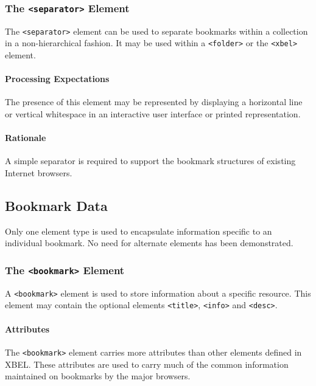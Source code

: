 \documentclass{howto}
\newcommand{\element}[1]{\texttt{<#1>}}
\begin{document}
    \subsubsection{The \element{separator} Element
                   \label{element-separator}}

      The \element{separator} element can be used to separate
      bookmarks within a collection in a non-hierarchical fashion.  It 
      may be used within a \element{folder} or the \element{xbel}
      element.

      \paragraph*{Processing Expectations}
        The presence of this element may be represented by displaying
        a horizontal line or vertical whitespace in an interactive
        user interface or printed representation.

      \paragraph*{Rationale}
        A simple separator is required to support the bookmark
        structures of existing Internet browsers.

  \subsection{Bookmark Data
              \label{bookmark-data}}

    Only one element type is used to encapsulate information specific
    to an individual bookmark.  No need for alternate elements has
    been demonstrated.

    \subsubsection{The \element{bookmark} Element
                   \label{element-bookmark}}

      A \element{bookmark} element is used to store information about
      a specific resource.  This element may contain the optional
      elements \element{title}, \element{info} and \element{desc}.

      \paragraph*{Attributes}
        The \element{bookmark} element carries more attributes than
        other elements defined in XBEL.  These attributes are used to
        carry much of the common information maintained on bookmarks
        by the major browsers.
\end{document}

